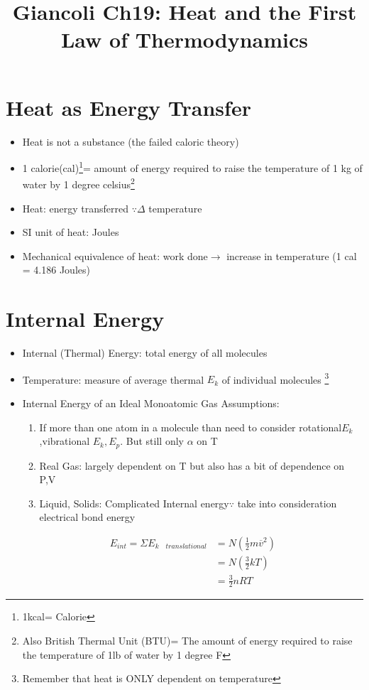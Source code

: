 \documentclass[12 pt , twoside, letterpaper] {article}
\begin{document}
\title{Giancoli Ch19: Heat and the First Law of Thermodynamics}
\date{}
\maketitle
\vspace{-78pt}
\section{Heat as Energy Transfer}
	\begin{itemize}
		\item Heat is not a substance (the failed caloric theory)
		\item 1 calorie(cal)\footnote{1kcal= Calorie}= amount of energy required to raise the 				temperature of 1 kg of water by 1 degree celsius\footnote{Also British Thermal Unit 				(BTU)= The amount of energy required to raise the temperature of 1lb of water by 1 				degree F}
		\item Heat: energy transferred $\because \Delta$ temperature
		\item SI unit of heat: Joules  
		\item Mechanical equivalence of heat: work done$\rightarrow$ increase in temperature (1 cal = 4.186 Joules)
	\end{itemize}

\section{Internal Energy}
	\begin{itemize}
		\item Internal (Thermal)  Energy: total energy of all molecules
		\item Temperature: measure of average thermal $E_k$ of individual molecules
			\footnote{Remember that heat is ONLY dependent on temperature}
		\item Internal Energy of an Ideal Monoatomic Gas
			Assumptions:
			\begin{enumerate}
			\item If more than one atom in a molecule than need to consider rotational$E_k$ ,vibrational $E_k, E_p$. But still only $\alpha$ on T		
			\item Real Gas: largely dependent on T but also has a bit of dependence on P,V
			\item Liquid, Solids: Complicated Internal energy$\because$ take into consideration 					electrical bond energy
			\end{enumerate}
			\begin{align}
				E_{int}=\Sigma E_{k\quad translational}&=N(\frac{1}{2}m\overline{v}^2)
																			\\&=N(\frac{3}{2}kT)		
																			\\&=\frac{3}{2}nRT
			\end{align}
	\end{itemize}
\end{document}
